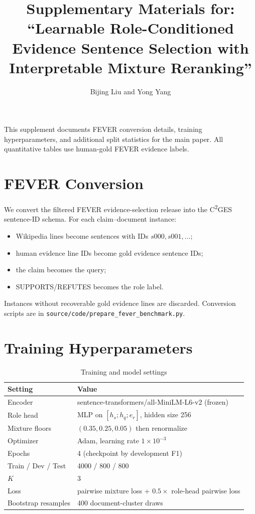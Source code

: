 \documentclass[11pt,letterpaper]{article}
\title{Supplementary Materials for:\\
``Learnable Role-Conditioned Evidence Sentence Selection with Interpretable Mixture Reranking''}
\author{Bijing Liu and Yong Yang}
\date{}
\begin{document}
\maketitle

\noindent This supplement documents FEVER conversion details, training hyperparameters, and additional split statistics for the main paper. All quantitative tables use human-gold FEVER evidence labels.

\section{FEVER Conversion}
\label{sec:s1}

We convert the filtered FEVER evidence-selection release into the C\textsuperscript{2}GES sentence-ID schema. For each claim--document instance:
\begin{itemize}
  \item Wikipedia lines become sentences with IDs $s000,s001,\ldots$;
  \item human evidence line IDs become gold evidence sentence IDs;
  \item the claim becomes the query;
  \item SUPPORTS/REFUTES becomes the role label.
\end{itemize}
Instances without recoverable gold evidence lines are discarded. Conversion scripts are in \texttt{source/code/prepare\_fever\_benchmark.py}.

\section{Training Hyperparameters}
\label{sec:s2}

\begin{table}[ht]
\centering
\caption{Training and model settings}
\label{tab:s2}
\begin{tabular}{ll}
\toprule
Setting & Value \\
\midrule
Encoder & sentence-transformers/all-MiniLM-L6-v2 (frozen) \\
Role head & MLP on $[h_s;h_q;e_r]$, hidden size 256 \\
Mixture floors & $(0.35,0.25,0.05)$ then renormalize \\
Optimizer & Adam, learning rate $1\times10^{-3}$ \\
Epochs & 4 (checkpoint by development F1) \\
Train / Dev / Test & 4000 / 800 / 800 \\
$K$ & 3 \\
Loss & pairwise mixture loss + $0.5\times$ role-head pairwise loss \\
Bootstrap resamples & 400 document-cluster draws \\
\bottomrule
\end{tabular}
\end{table}
\end{document}
